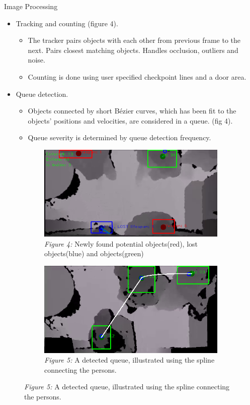 \documentclass[final,hyperref={pdfpagelabels=false}]{beamer}
\begin{document}
\begin{frame}[t]
\begin{columns}[t]
\begin{column}{.465\textwidth}
\begin{block}{Image Processing}
\begin{itemize}
	\item Tracking and counting (figure 4).
	\begin{itemize}
		\item{The tracker pairs objects with each other from previous frame to the next. Pairs closest matching objects. Handles occlusion, outliers and noise.}
		\item{Counting is done using user specified checkpoint lines and a door area.}
	\end{itemize}
	
	\item Queue detection.
	\begin{itemize}
		\item Objects connected by short Bézier curves, which has been fit to the objects' positions and velocities, are considered in a queue. (fig 4).
		\item Queue severity is determined by queue detection frequency.
	\end{itemize}
\end{itemize}

\begin{figure}
\begin{subfigure}{.5\textwidth}
\centering
\includegraphics[width=0.9\linewidth]{trackingExample.png}
\caption{\centering \textit{Figure 4:} Newly found potential objects(red), lost 
		 objects(blue) and objects(green)}
\end{subfigure}%
\begin{subfigure}{.5\textwidth}
\centering
\includegraphics[width=0.9\linewidth]{visibleQueue.png}
\caption{\centering \textit{Figure 5:} A detected queue, illustrated using the spline connecting the persons.}
\end{subfigure}
\end{figure}


\end{block}
\end{column}
\end{columns}
\end{frame}
\end{document}
